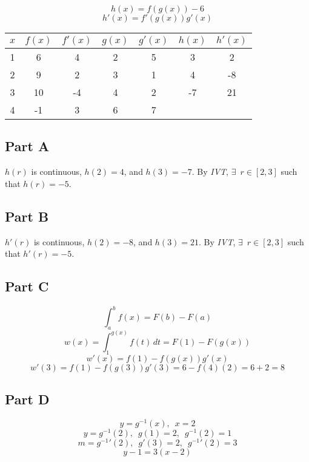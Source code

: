 \[ h(x) = f(g(x))-6 \]
\[ h'(x) = f'(g(x))g'(x) \]
\begin{center}
	\begin{tabular}{ | c || c | c | c | c | c | c | }
		\hline
		\rule{0pt}{4ex}
		$x$ & $f(x)$ & $f'(x)$ & $g(x)$ & $g'(x)$ & $h(x)$ & $h'(x)$ \\
		\hline
		\hline
		1 & 6  & 4  & 2 & 5 & 3  & 2 \\
		\hline
		2 & 9  & 2  & 3 & 1 & 4  & -8 \\
		\hline
		3 & 10 & -4 & 4 & 2 & -7 & 21 \\
		\hline
		4 & -1 & 3  & 6 & 7 & & \\
		\hline
	\end{tabular}
\end{center}

\subsection{Part A}
$h(r)$ is continuous, $h(2) = 4$, and $h(3) = -7$. By \textit{IVT}, $\exists \enspace r \in [2, 3]$ such that $h(r) = -5$.

\subsection{Part B}
$h'(r)$ is continuous, $h(2) = -8$, and $h(3) = 21$. By \textit{IVT}, $\exists \enspace r \in [2, 3]$ such that $h'(r) = -5$.

\subsection{Part C}
\[ \int_{a}^{b} f(x) = F(b) - F(a) \]
\[ w(x) = \int_{1}^{g(x)} f(t)\,dt = F(1) - F(g(x)) \]
\[ w'(x) = f(1) - f(g(x))g'(x) \]
\[ w'(3) = f(1) - f(g(3))g'(3) = 6 - f(4)(2) = 6 + 2 = 8 \]

\subsection{Part D}
\[ y = g^{-1}(x), \enspace x = 2 \]
\[ y = g^{-1}(2), \enspace g(1) = 2, \enspace g^{-1}(2) = 1 \]
\[ m = g^{-1}'(2), \enspace g'(3) = 2, \enspace g^{-1}'(2) = 3 \]
\[ y - 1 = 3(x - 2) \]
